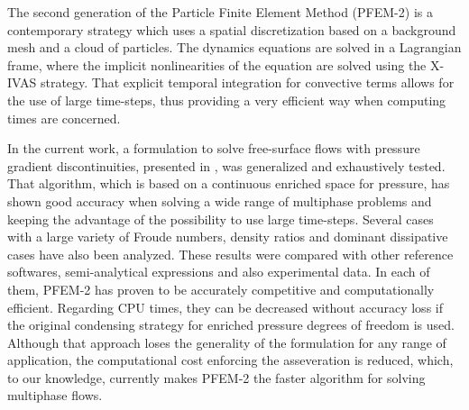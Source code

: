 \documentclass[review]{elsarticle}
\begin{document}
The second generation of the Particle Finite Element Method (PFEM-2) is a contemporary strategy which uses a spatial discretization based on a background mesh and a cloud of particles. The dynamics equations are solved in a Lagrangian frame, where the implicit nonlinearities of the equation are solved using the {X-IVAS} strategy. That explicit temporal integration for convective terms allows for the use of large time-steps, thus providing a very efficient way when computing times are concerned.


In the current work, a formulation to solve free-surface flows with pressure gradient discontinuities, presented in \cite{Idelsohn13c}, was generalized and exhaustively tested. That algorithm, which is based on a continuous enriched space for pressure, has shown good accuracy when solving a wide range of multiphase problems and keeping the advantage of the possibility to use large time-steps. Several cases with a large variety of Froude numbers, density ratios and dominant dissipative cases have also been analyzed. These results were compared with other reference softwares, semi-analytical expressions and also experimental data. In each of them, PFEM-2 has proven to be accurately competitive and computationally efficient. Regarding CPU times, they can be decreased without accuracy loss if the original condensing strategy for enriched pressure degrees of freedom is used. Although that approach loses the generality of the formulation for any range of application, the computational cost enforcing the asseveration is reduced, which, to our knowledge, currently makes PFEM-2 the faster algorithm for solving multiphase flows.
\end{document}
